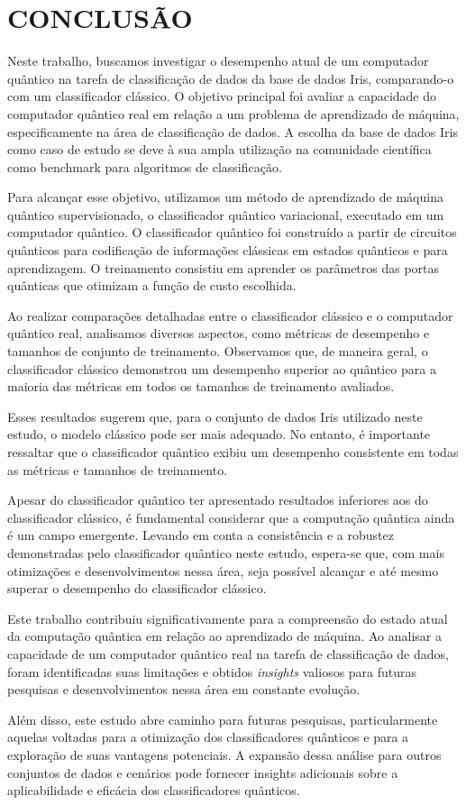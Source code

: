 \chapter{CONCLUSÃO} \label{chap_conclusao}

Neste trabalho, buscamos investigar o desempenho atual de um computador quântico na tarefa de classificação de dados da base de dados Iris, comparando-o com um classificador clássico. O objetivo principal foi avaliar a capacidade do computador quântico real em relação a um problema de aprendizado de máquina, especificamente na área de classificação de dados. A escolha da base de dados Iris como caso de estudo se deve à sua ampla utilização na comunidade científica como benchmark para algoritmos de classificação.

Para alcançar esse objetivo, utilizamos um método de aprendizado de máquina quântico supervisionado, o classificador quântico variacional, executado em um computador quântico. O classificador quântico foi construído a partir de circuitos quânticos para codificação de informações clássicas em estados quânticos e para aprendizagem. O treinamento consistiu em aprender os parâmetros das portas quânticas que otimizam a função de custo escolhida.

Ao realizar comparações detalhadas entre o classificador clássico e o computador quântico real, analisamos diversos aspectos, como métricas de desempenho e tamanhos de conjunto de treinamento. Observamos que, de maneira geral, o classificador clássico demonstrou um desempenho superior ao quântico para a maioria das métricas em todos os tamanhos de treinamento avaliados.

Esses resultados sugerem que, para o conjunto de dados Iris utilizado neste estudo, o modelo clássico pode ser mais adequado. No entanto, é importante ressaltar que o classificador quântico exibiu um desempenho consistente em todas as métricas e tamanhos de treinamento.

Apesar do classificador quântico ter apresentado resultados inferiores aos do classificador clássico, é fundamental considerar que a computação quântica ainda é um campo emergente. Levando em conta a consistência e a robustez demonstradas pelo classificador quântico neste estudo, espera-se que, com mais otimizações e desenvolvimentos nessa área, seja possível alcançar e até mesmo superar o desempenho do classificador clássico.

Este trabalho contribuiu significativamente para a compreensão do estado atual da computação quântica em relação ao aprendizado de máquina. Ao analisar a capacidade de um computador quântico real na tarefa de classificação de dados, foram identificadas suas limitações e obtidos \textit{insights} valiosos para futuras pesquisas e desenvolvimentos nessa área em constante evolução.

Além disso, este estudo abre caminho para futuras pesquisas, particularmente aquelas voltadas para a otimização dos classificadores quânticos e para a exploração de suas vantagens potenciais. A expansão dessa análise para outros conjuntos de dados e cenários pode fornecer insights adicionais sobre a aplicabilidade e eficácia dos classificadores quânticos.